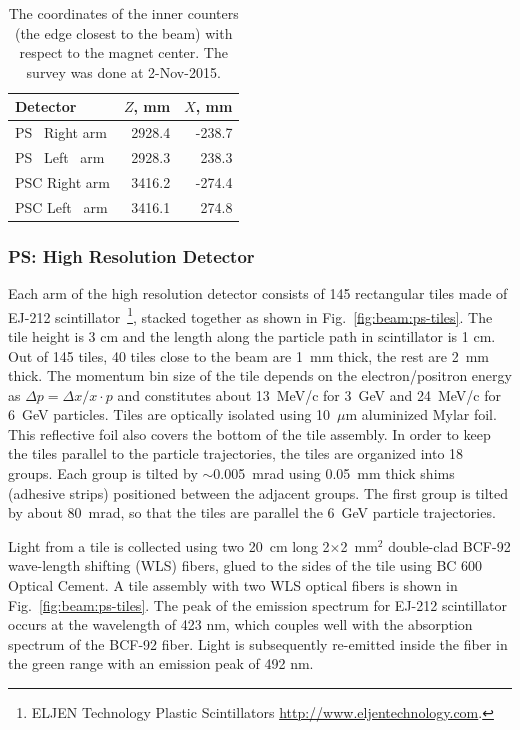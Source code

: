 \begin{table}[h]
  \begin{center}
    \caption{The coordinates of the inner counters (the edge closest to the beam)
             with respect to the magnet center. The survey was done at 2-Nov-2015. 
       \label{tab:beam:ps-ccordinates}
    }
    \begin{tabular}{l|r|r}
       \hline
       Detector & $Z$, mm & $X$, mm \\
       \hline
       \hline
       PS~ Right arm & 2928.4 & -238.7 \\
       PS~ Left~ arm & 2928.3 &  238.3 \\
       PSC Right arm & 3416.2 & -274.4 \\
       PSC Left~ arm & 3416.1 & ~274.8 \\
       \hline
    \end{tabular}
  \end{center}
\end{table}

\subsubsection[PS: High Resolution Detector]{PS: High Resolution Detector
  \label{sec:beamline:ps-hresol}
}

Each arm of the high resolution detector consists of 145 rectangular
tiles made of EJ-212 scintillator~\footnote{
  ELJEN Technology Plastic Scintillators \url{http://www.eljentechnology.com}. 
}, stacked together as
shown in Fig.~\ref{fig:beam:ps-tiles}. The tile height is 3 cm and the
length along the particle path in scintillator is 1 cm. Out of 145 tiles,
40 tiles close to the beam are 1~mm thick, the rest are 2~mm thick.
 The momentum
bin size of the tile depends on the electron/positron energy as 
$\Delta{}p=\Delta{}x/x\cdot{}p$ 
and constitutes about 13~MeV/c for 3~GeV and 24~MeV/c for 6~GeV particles.
Tiles are optically isolated using 10~$\mu$m
aluminized Mylar foil. This reflective foil also covers the bottom of
the tile assembly. In order to keep the tiles parallel to the
particle trajectories, the tiles are organized into 18 groups. Each
group is tilted by $\sim$0.005~mrad using 0.05~mm thick shims
(adhesive strips) positioned between the adjacent groups. The 
first group is tilted by about 80~mrad, so that the tiles are parallel
the 6~GeV particle trajectories.

Light from a tile is collected using two 20~cm long 2$\times$2~mm$^2$
double-clad BCF-92 wave-length shifting (WLS) fibers,
glued to the sides of the tile using BC 600 Optical Cement. A tile
assembly with two WLS optical fibers is shown in
Fig.~\ref{fig:beam:ps-tiles}. The peak of the emission spectrum for EJ-212
scintillator occurs at the wavelength of 423 nm, which couples well
with the absorption spectrum of the BCF-92 fiber. Light is
subsequently re-emitted inside the fiber in the green range with an
emission peak of 492 nm.

